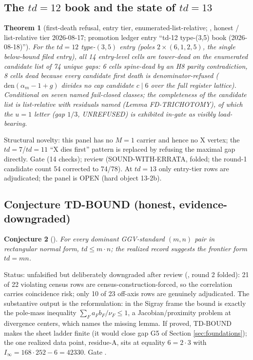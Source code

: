 \documentclass[11pt]{article}
\newtheorem{theorem}{Theorem}[section]
\newtheorem{conjecture}[theorem]{Conjecture}
\theoremstyle{definition}
\theoremstyle{remark}
\begin{document}
\subsection{The $td=12$ book and the state of $td=13$}

\begin{theorem}[first-death refusal, entry tier, enumerated-list-relative;
, honest / list-relative tier 2026-08-17; promotion
ledger entry  ``td-12 type-(3,5) book (2026-08-18)'']
For the $td=12$ type-$(3,5)$ entry (poles $2\times(6,1,2,5)$, the single
below-bound filed entry), all 14 entry-level cells are tower-dead on the
enumerated candidate list of 74 unique gaps: 6 cells spine-dead by an H8
parity contradiction, 8 cells dead because every candidate first death is
denominator-refused ($\mathrm{den}(\alpha_m-1+g)$ divides no cap candidate
$c\mid 6$ over the full register lattice). Conditional on seven named
fail-closed classes; the completeness of the candidate list is
list-relative with residuals named (Lemma FD-TRICHOTOMY), of which the
$u=1$ letter (gap $1/3$, UNREFUSED) is exhibited in-gate as visibly
load-bearing.
\end{theorem}

Structural novelty: this panel has no $M=1$ carrier and hence no X vertex;
the $td=7$/$td=11$ ``X dies first'' pattern is replaced by refusing the
maximal gap directly. Gate  (14 checks); review
 (SOUND-WITH-ERRATA, folded; the round-1
candidate count 54 corrected to 74/78). At $td=13$ only entry-tier rows are
adjudicated; the panel is OPEN (hard object 13-2b).

\subsection{Conjecture TD-BOUND (honest, evidence-downgraded)}

\begin{conjecture}[]
For every dominant GGV-standard $(m,n)$ pair in rectangular normal form,
$td\le m\cdot n$; the realized record suggests the frontier form $td=mn$.
\end{conjecture}

Status: unfalsified but deliberately downgraded after review
(, round 2 folded): 21 of 22 violating census
rows are census-construction-forced, so the correlation carries coincidence
risk; only 10 of 23 off-axis rows are genuinely adjudicated. The
substantive output is the reformulation: in the Sigray frame the bound is
exactly the pole-mass inequality $\sum_F a_F b_F/\nu_F\le 1$, a
Jacobian/proximity problem at divergence centers, which names the missing
lemma. If proved, TD-BOUND makes the sheet ladder finite (it would close
gap G5 of Section \ref{sec:foundations}); the one realized data point,
residue-A, sits at equality $6=2\cdot 3$ with
$I_\infty=168\cdot 252-6=42330$. Gate .
\end{document}
